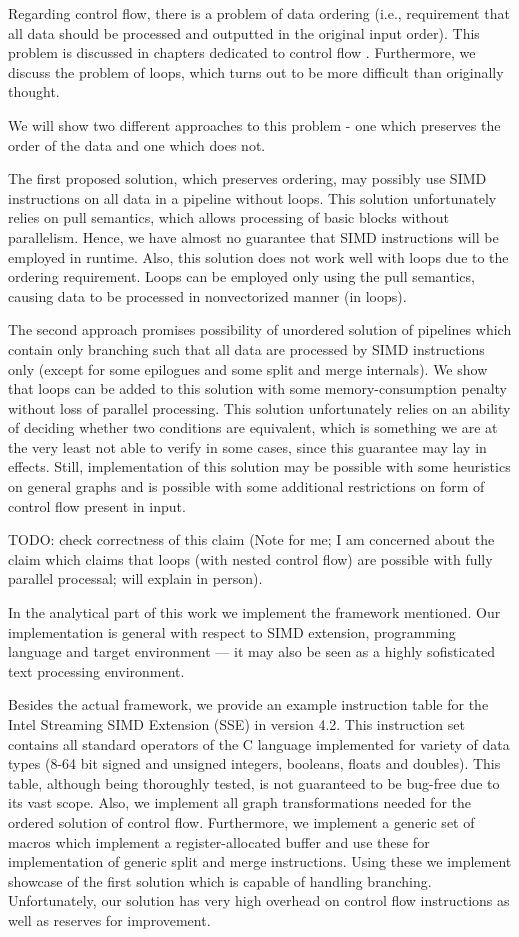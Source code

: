   Regarding control flow, there is a problem of data ordering (i.e., requirement that all data should be processed and outputted in the original input order). This problem is discussed in chapters dedicated to control flow .  Furthermore, we discuss the problem of loops, which turns out to be more difficult than originally thought.  


We will show two different approaches to this problem - one which preserves the order of the data and one which does not. 


  The first proposed solution, which preserves ordering, may possibly use SIMD instructions on all data in a pipeline without loops. This solution unfortunately relies on pull semantics, which allows processing of basic blocks without parallelism. Hence, we have almost no guarantee that SIMD instructions will be employed in runtime. Also, this solution does not work well with loops due to the ordering requirement. Loops can be employed only using the pull semantics, causing data to be processed in nonvectorized manner (in loops).


The second approach promises possibility of unordered solution of pipelines which contain only branching such that all data are processed by SIMD instructions only (except for some epilogues and some split and merge internals). We show that loops can be added to this solution with some memory-consumption penalty without loss of parallel processing. This solution unfortunately relies on an ability of deciding whether two conditions are equivalent, which is something we are at the very least not able to verify in some cases, since this guarantee may lay in effects. Still, implementation of this solution may be possible with some heuristics on general graphs and is possible with some additional restrictions on form of control flow present in input.


  TODO: check correctness of this claim (Note for me; I am concerned about the claim which claims that loops (with nested control flow) are possible with fully parallel processal; will explain in person).


  In the analytical part of this work we implement the framework mentioned. Our implementation is general with respect to SIMD extension, programming language and target environment --- it may also be seen as a highly sofisticated text processing environment.


Besides the actual framework, we provide an example instruction table for the Intel Streaming SIMD Extension (SSE) in version 4.2. This instruction set contains all standard operators of the C language implemented for variety of data types (8-64 bit signed and unsigned integers, booleans, floats and doubles). This table, although being thoroughly tested, is not guaranteed to be bug-free due to its vast scope. Also, we implement all graph transformations needed for the ordered solution of control flow. Furthermore, we implement a generic set of macros which implement a register-allocated buffer and use these for implementation of generic split and merge instructions. Using these we implement showcase of the first solution which is capable of handling branching. Unfortunately, our solution has very high overhead on control flow instructions as well as reserves for improvement. 

